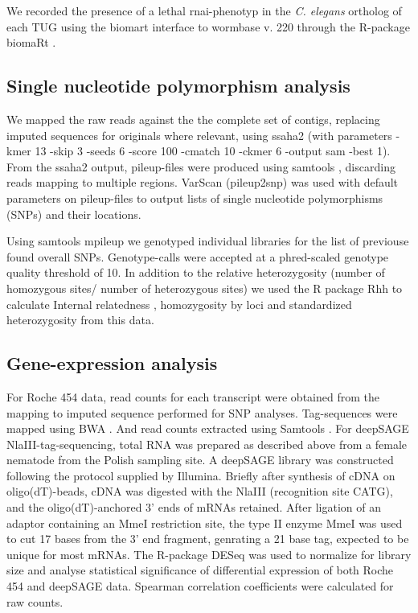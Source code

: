 \documentclass[10pt]{bmc_article}
\newenvironment{bmcformat}{\begin{raggedright}\baselineskip20pt\sloppy\setboolean{publ}{false}}{\end{raggedright}\baselineskip20pt\sloppy}
\begin{document}
\begin{bmcformat}
We recorded the presence of a lethal rnai-phenotyp in the
\textit{C. elegans} ortholog of each TUG using the biomart
\cite{pmid22083790} interface to wormbase v. 220 through the R-package
biomaRt \cite{pmid19617889}.

\subsection*{Single nucleotide polymorphism analysis}

We mapped the raw reads against the the complete set of contigs,
replacing imputed sequences for originals where relevant, using ssaha2
(with parameters -kmer 13 -skip 3 -seeds 6 -score 100 -cmatch 10
-ckmer 6 -output sam -best 1). From the ssaha2 output, pileup-files
were produced using samtools
\cite{journals/bioinformatics/LiHWFRHMAD09}, discarding reads mapping
to multiple regions. VarScan \cite{pmid19542151} (pileup2snp) was used
with default parameters on pileup-files to output lists of single
nucleotide polymorphisms (SNPs) and their locations.

Using samtools mpileup we genotyped individual libraries for the list
of previouse found overall SNPs. Genotype-calls were accepted at a
phred-scaled genotype quality threshold of 10.  In addition to the
relative heterozygosity (number of homozygous sites/ number of
heterozygous sites) we used the R package Rhh \cite{pmid21565077} to
calculate Internal relatedness \cite{pmid11571049}, homozygosity by
loci \cite{pmid17107491} and standardized heterozygosity
\cite{coltman81j} from this data.


\subsection*{Gene-expression analysis}

For Roche 454 data, read counts for each transcript were obtained from
the mapping to imputed sequence performed for SNP
analyses. Tag-sequences were mapped using BWA \cite{pmid19451168}. And
read counts extracted using Samtools
\cite{journals/bioinformatics/LiHWFRHMAD09}. For deepSAGE
NlaIII-tag-sequencing, total RNA was prepared as described above from
a female nematode from the Polish sampling site. A deepSAGE library
was constructed following the protocol supplied by Illumina. Briefly
after synthesis of cDNA on oligo(dT)-beads, cDNA was digested with the
NlaIII (recognition site CATG), and the oligo(dT)-anchored 3' ends of
mRNAs retained. After ligation of an adaptor containing an MmeI
restriction site, the type II enzyme MmeI was used to cut 17 bases
from the 3' end fragment, genrating a 21 base tag, expected to be
unique for most mRNAs. The R-package DESeq \cite{pmid20979621} was
used to normalize for library size and analyse statistical
significance of differential expression of both Roche 454 and deepSAGE
data. Spearman correlation coefficients were calculated for raw
counts.


\end{bmcformat}
\end{document}

